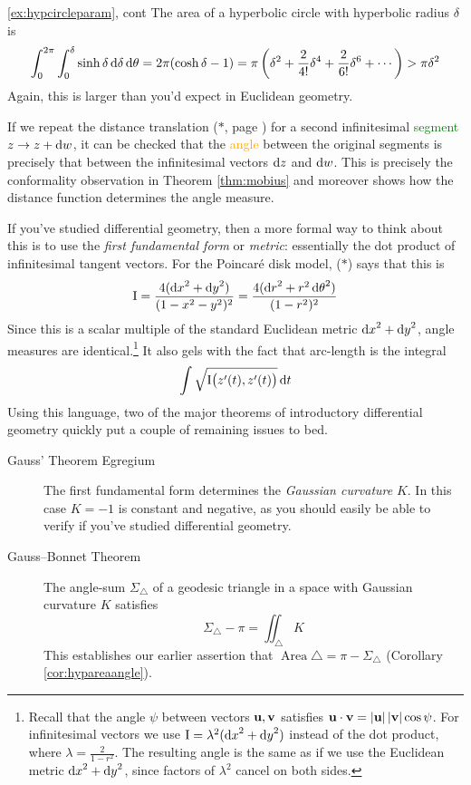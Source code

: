 \begin{example*}{\ref{ex:hypcircleparam}, cont}
	The area of a hyperbolic circle with hyperbolic radius $\delta$ is
	\[
		\int_0^{2\pi}\int_0^\delta\sinh\delta\,\mathrm{d}\delta\,{\mathrm{d}\theta} =2\pi(\cosh\delta-1) =\pi\left(\delta^2+\frac{2}{4!}\delta^4+\frac{2}{6!}\delta^6+\cdots\right)>\pi\delta^2
	\]
	Again, this is larger than you'd expect in Euclidean geometry.
\end{example*}

\goodbreak

\label{pg:hypareaext}

If we repeat the distance translation ($\ast$, page \pageref{pg:hyp1stform}) for a second infinitesimal \textcolor{Green}{segment} $z\to z+{\mathrm{d} w}$, it can be checked that the \textcolor{orange}{angle} between the original segments is precisely that between the infinitesimal vectors ${\mathrm{d} z}$ and ${\mathrm{d} w}$. This is precisely the conformality observation in Theorem \ref{thm:mobius} and moreover shows how the distance function determines the angle measure.\smallbreak

If you've studied differential geometry, then a more formal way to think about this is to use the \emph{first fundamental form} or \emph{metric}: essentially the dot product of infinitesimal tangent vectors. For the Poincaré disk model, ($\ast$) says that this is
\[
	\mathrm{I} =\frac{4({\mathrm{d} x}^2+{\mathrm{d} y}^2)}{(1-x^2-y^2)^2} =\frac{4({\mathrm{d} r}^2+r^2\,{\mathrm{d}\theta}^2)}{(1-r^2)^2} 
\]
Since this is a scalar multiple of the standard Euclidean metric ${\mathrm{d} x}^2+{\mathrm{d} y}^2$, angle measures are identical.\footnote{%
	Recall that the angle $\psi$ between vectors ${\mathbf{u}},{\mathbf{v}}$ satisfies ${\mathbf{u}}\cdot{\mathbf{v}}=\left| {\mathbf{u}}\right|\left| {\mathbf{v}}\right|\cos\psi$. For infinitesimal vectors we use $\mathrm{I}=\lambda^2({\mathrm{d} x}^2+{\mathrm{d} y}^2)$ instead of the dot product, where $\lambda=\frac 2{1-r^2}$. The resulting angle is the same as if we use the Euclidean metric ${\mathrm{d} x}^2+{\mathrm{d} y}^2$, since factors of $\lambda^2$ cancel on both sides.
}
It also gels with the fact that arc-length is the integral
\[
	\int\sqrt{\mathrm{I}\bigl(z'(t),z'(t)\bigr)}\,{\mathrm{d} t}
\]
Using this language, two of the major theorems of introductory differential geometry quickly put a couple of remaining issues to bed.
\begin{description}
	\item[Gauss' Theorem Egregium] The first fundamental form determines the \emph{Gaussian curvature} $K$. In this case $K=-1$ is constant and negative, as you should easily be able to verify if you've studied differential geometry.
	\item[Gauss--Bonnet Theorem] The angle-sum $\Sigma_\triangle$ of a geodesic triangle in a space with Gaussian curvature $K$ satisfies
	\[
		\Sigma_\triangle-\pi=\iint_\triangle K
	\]
	This establishes our earlier assertion that $\operatorname{Area}\triangle =\pi-\Sigma_\triangle$ (Corollary \ref{cor:hypareaangle}).
\end{description}


